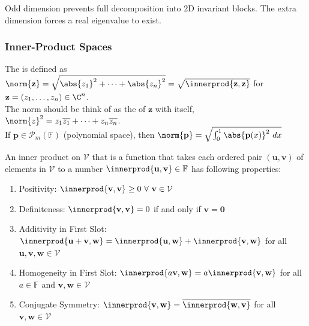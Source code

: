Odd dimension prevents full decomposition into $2$D invariant blocks. The extra dimension forces a real eigenvalue to exist.

\subsubsection{Inner-Product Spaces}

\begin{definition} The  is defined as $\norm{\mathbf{z}} = \sqrt{\abs{z_1}^2 + \cdots + \abs{z_n}^2} = \sqrt{\innerprod{\mathbf{z}, \mathbf{z}}}$ for $\mathbf{z} = (z_1, \ldots, z_n) \in \C^n$.\\
The norm should be think of as the  of $\mathbf{z}$ with itself, $\norm{z}^2 = z_1 \overline{z_1} + \cdots + z_n \overline{z_n}$.\\
If $\mathbf{p} \in \mathcal{P}_m(\mathbb{F})$ (polynomial space), then $\norm{\mathbf{p}} = \sqrt{\int_0^1 \abs{\mathbf{p}(x)}^2 \ dx}$
\end{definition}

\begin{remark} An inner product on $\mathcal{V}$ that is a function that takes each ordered pair $(\mathbf{u}, \mathbf{v})$ of elements in $\mathcal{V}$ to a number $\innerprod{\mathbf{u}, \mathbf{v}} \in \mathbb{F}$ has following properties:
\begin{enumerate}[label=\roman*.]
\setlength{\itemsep}{0pt}
\item Positivity: $\innerprod{\mathbf{v}, \mathbf{v}} \geq 0 \ \forall \ \mathbf{v} \in \mathcal{V}$
\item Definiteness: $\innerprod{\mathbf{v}, \mathbf{v}} = 0$ if and only if $\mathbf{v} = \mathbf{0}$
\item Additivity in First Slot: $\innerprod{\mathbf{u} + \mathbf{v}, \mathbf{w}} = \innerprod{\mathbf{u}, \mathbf{w}} + \innerprod{\mathbf{v}, \mathbf{w}}$ for all $\mathbf{u}, \mathbf{v}, \mathbf{w} \in \mathcal{V}$
\item Homogeneity in First Slot: $\innerprod{a\mathbf{v}, \mathbf{w}} = a \innerprod{\mathbf{v}, \mathbf{w}}$ for all $a \in \mathbb{F}$ and $\mathbf{v}, \mathbf{w} \in \mathcal{V}$
\item Conjugate Symmetry: $\innerprod{\mathbf{v}, \mathbf{w}} = \overline{\innerprod{\mathbf{w}, \mathbf{v}}}$ for all $\mathbf{v}, \mathbf{w} \in \mathcal{V}$
\end{enumerate}
\end{remark}

